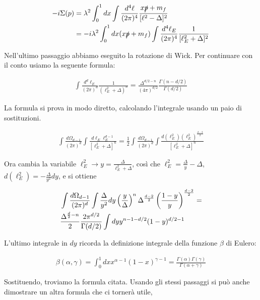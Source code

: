 \documentclass[11pt]{report}
\begin{document}
\begin{align}
    -i\Sigma(p) &= \lambda^2\int_0^1 dx \int \frac{d^4\ell}{(2\pi)^4} \frac{x\slashed{p} + m_f}{[\ell^2 - \Delta]^2} \notag \\ 
    &= -i\lambda^2 \int_0^1 dx (x\slashed{p} + m_f)\int \frac{d^4\ell_E}{(2\pi)^4}\frac{1}{[\ell_E^2 + \Delta]^2}
\end{align}

Nell'ultimo passaggio abbiamo eseguito la rotazione di Wick. Per continuare con il conto usiamo la seguente formula: 

\begin{align}
    \int \frac{d^d\ell_E}{(2\pi)^d}\frac{1}{(\ell_E^2 + \Delta)^n} = \frac{\Delta^{d/2-n}}{(4\pi)^{d/2}}\frac{\Gamma(n-d/2)}{\Gamma(d/2)}
\end{align}

La formula si prova in modo diretto, calcolando l'integrale usando un paio di sostituzioni. 

\begin{align}
    \int \frac{d\Omega_{d-1}}{(2\pi)^d}\int \frac{d\ell_E \ell_E^{d-1}}{[\ell_E^2 + \Delta]^n} = \frac{1}{2}\int \frac{d\Omega_{d-1}}{(2\pi)^d}\int \frac{d(\ell_E^2)(\ell_E^2)^{\frac{d-2}{2}}}{[\ell_E^2 + \Delta]^n} 
\end{align}

Ora cambia la variabile \(\ell_E^2 \to y = \frac{\Delta}{\ell_E^2 + \Delta}\), così che \(\ell_E^2 = \frac{\Delta}{y} - \Delta\), \(d(\ell_E^2) = -\frac{\Delta}{y^2}dy\), e si ottiene 

\begin{align}
    &\int \frac{d\Omega_{d-1}}{(2\pi)^d}\int \frac{\Delta}{y^2}dy\left(\frac{y}{\Delta} \right)^n\Delta^{\frac{d-2}{2}}\left(\frac{1-y}{y} \right)^{\frac{d-2}{2}} =  \notag \\ 
    &\frac{\Delta^{\frac{d}{2}-n}}{2}\frac{2\pi^{d/2}}{\Gamma(d/2)}\int dy y^{n-1-d/2}(1-y)^{d/2-1}
\end{align}

L'ultimo integrale in \(dy\) ricorda la definizione integrale della funzione \(\beta\) di Eulero: 

\begin{align}
    \beta(\alpha, \gamma) = \int_0^1 dx x^{\alpha-1}(1-x)^{\gamma-1} = \frac{\Gamma(\alpha)\Gamma(\gamma)}{\Gamma(\alpha+\gamma)}
\end{align}

Sostituendo, troviamo la formula citata. Usando gli stessi passaggi si può anche dimostrare un altra formula che ci tornerà utile, 
\end{document}
